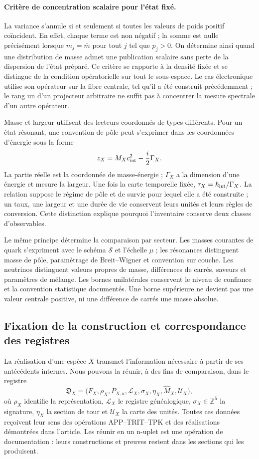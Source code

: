 \paragraph{Critère de concentration scalaire pour l’état fixé.}
La variance s'annule si et seulement si toutes les valeurs de poids positif
coïncident. En effet, chaque terme est non négatif ; la somme est nulle
précisément lorsque \(m_j=\overline m\) pour tout \(j\) tel que
\(p_j>0\). On détermine ainsi quand une distribution de masse admet
une publication scalaire sans perte de la dispersion de l'état préparé.
Ce critère se rapporte à la densité fixée et se distingue de la condition
opératorielle sur tout le sous-espace. Le cas électronique utilise son
opérateur sur la fibre centrale, tel qu'il a été construit précédemment ;
le rang un d'un projecteur arbitraire ne suffit pas à concentrer la mesure
spectrale d'un autre opérateur.

Masse et largeur utilisent des lecteurs coordonnés de types différents. Pour un
état résonant, une convention de pôle peut s’exprimer dans les coordonnées
d’énergie sous la forme
\[
 z_X=M_Xc_{\rm int}^{2}-\frac{i}{2}\Gamma_X.
\]
La partie réelle est la coordonnée de masse-énergie ; \(\Gamma_X\) a
la dimension d'une énergie et mesure la largeur. Une fois la carte temporelle fixée,
\(\tau_X=\hbar_{\rm int}/\Gamma_X\). La relation suppose le régime de
pôle et de survie pour lequel elle a été construite ; un taux, une largeur et
une durée de vie conservent leurs unités et leurs règles de conversion. Cette
distinction explique pourquoi l'inventaire conserve deux classes d'observables.

Le même principe détermine la comparaison par secteur. Les masses courantes
de quark s’expriment avec le schéma \(\mathscr S\) et l’échelle \(\mu\) ;
les résonances distinguent masse de pôle, paramétrage de Breit--Wigner et
convention sur couche. Les neutrinos distinguent valeurs propres de masse,
différences de carrés, saveurs et paramètres de mélange. Les bornes
unilatérales conservent le niveau de confiance et la convention statistique
documentés. Une borne supérieure ne devient pas une valeur centrale positive,
ni une différence de carrés une masse absolue.

\subsection{Fixation de la construction et correspondance des registres}
\label{vi:subsec:vi-congelacion}

La réalisation d’une espèce \(X\) transmet l’information nécessaire
à partir de ses antécédents internes. Nous pouvons la réunir, à des fins de comparaison,
dans le registre
\[
 \mathfrak D_X=
 \bigl(F_X,\rho_X,P_{X,a},\mathcal L_X,
       \sigma_X,\eta_X,\widehat M_X,\mathcal U_X\bigr),
\]
où \(\rho_X\) identifie la représentation, \(\mathcal L_X\) le
registre généalogique, \(\sigma_X\in\mathbb Z^5\) la signature,
\(\eta_X\) la section de tour et \(\mathcal U_X\) la carte des
unités. Toutes ces données reçoivent leur sens des opérations
APP--TRIT--TPK et des réalisations démontrées dans l'article. Les réunir
en un n-uplet est une opération de documentation : leurs constructions et
preuves restent dans les sections qui les produisent.

